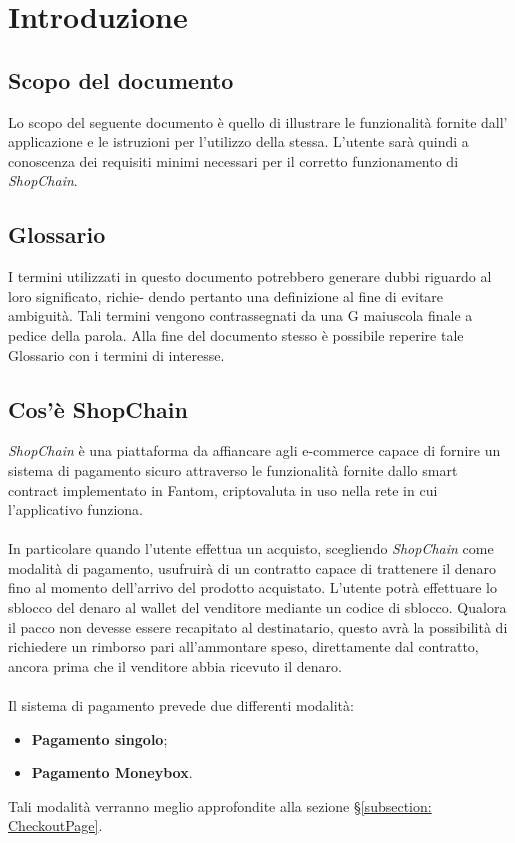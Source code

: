 \section{Introduzione}\label{section:introduzione}

\subsection{Scopo del documento}
Lo scopo del seguente documento è quello di illustrare le funzionalità fornite dall' applicazione e le istruzioni per l'utilizzo della stessa.
L'utente sarà quindi a conoscenza dei requisiti minimi necessari per il corretto funzionamento di \textit{ShopChain}.

\subsection{Glossario}
I termini utilizzati in questo documento potrebbero generare dubbi riguardo al loro significato, richie-
dendo pertanto una definizione al fine di evitare ambiguità. Tali termini vengono contrassegnati da
una G maiuscola finale a pedice della parola. Alla fine del documento stesso è possibile reperire tale Glossario con i termini di interesse.

\subsection{Cos'è ShopChain}
\textit{ShopChain} è una piattaforma da affiancare agli e-commerce\glo{} capace di fornire un sistema di pagamento sicuro attraverso le funzionalità fornite dallo smart contract\glo{} implementato in Fantom\glo{}, criptovaluta\glo{} in uso nella rete in cui l'applicativo funziona.\\\\
In particolare quando l'utente effettua un acquisto, scegliendo \textit{ShopChain} come modalità di pagamento, usufruirà di un contratto capace di trattenere il denaro fino al momento dell'arrivo del prodotto acquistato. L'utente potrà effettuare lo sblocco  del denaro al wallet\glo{} del venditore mediante un codice di sblocco. Qualora il pacco non devesse essere recapitato al destinatario, questo avrà la possibilità di richiedere un rimborso pari all'ammontare speso, direttamente dal contratto, ancora prima che il venditore abbia ricevuto il denaro.\\\\
Il sistema di pagamento prevede due differenti modalità:
\begin{itemize}
    \item \textbf{Pagamento singolo};
    \item  \textbf{Pagamento Moneybox}.
\end{itemize}
Tali modalità verranno meglio approfondite alla sezione §\ref{subsection: CheckoutPage}.

